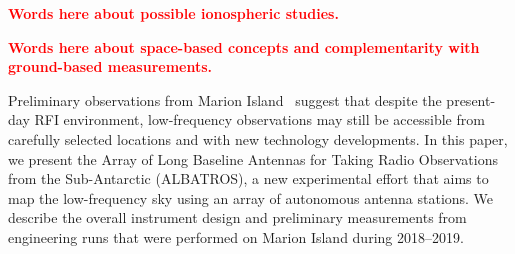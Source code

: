 \documentclass{ws-jai}
\def\albatros{ALBATROS}
\newcommand{\attention}[1]{\textcolor{red}{\bf {#1}}}
\begin{document}
\attention{Words here about possible ionospheric studies.}

\attention{Words here about space-based concepts and complementarity
  with ground-based measurements.}

Preliminary observations from Marion
Island~\citep{2019JAI.....850004P} suggest that despite the
present-day RFI environment, low-frequency observations may still be
accessible from carefully selected locations and with new technology
developments.  In this paper, we present the Array of Long Baseline
Antennas for Taking Radio Observations from the Sub-Antarctic
(\albatros), a new experimental effort that aims to map the
low-frequency sky using an array of autonomous antenna stations.  We
describe the overall instrument design and preliminary measurements
from engineering runs that were performed on Marion Island during
2018--2019.
\end{document}
